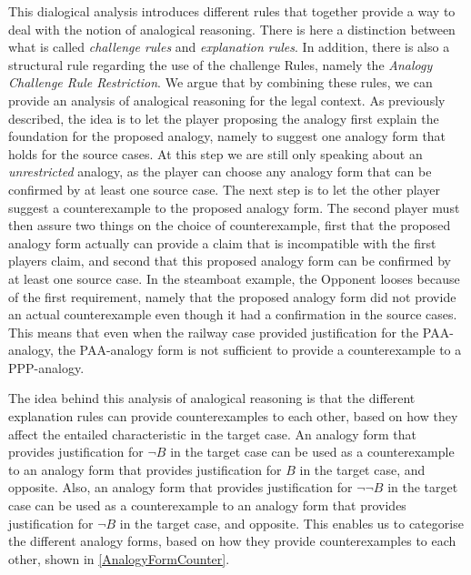				This dialogical analysis introduces different rules that together provide a way to deal with the notion of analogical reasoning. There is here a distinction between what is called \textit{challenge rule\index{rule!challenge}s} and \textit{explanation rules}. In addition, there is also a structural rule regarding the use of the challenge Rule\index{rule!challenge}s, namely the \textit{Analogy Challenge Rule Restriction}. We argue that by combining these rules, we can provide an analysis of analogical reasoning for the legal context. As previously described, the idea is to let the player proposing the analogy first explain the foundation for the proposed analogy, namely to suggest one analogy form that holds for the source cases. At this step we are still only speaking about an \textit{unrestricted} analogy, as the player can choose any analogy form that can be confirmed by at least one source case. The next step is to let the other player suggest a counterexample to the proposed analogy form. The second player must then assure two things on the choice of counterexample, first that the proposed analogy form actually can provide a claim that is incompatible with the first players claim, and second that this proposed analogy form can be confirmed by at least one source case. In the steamboat example, the Opponent looses because of the first requirement, namely that the proposed analogy form did not provide an actual counterexample even though it had a confirmation in the source cases. This means that even when the railway case provided justification for the PAA-analogy, the PAA-analogy form is not sufficient to provide a counterexample to a PPP-analogy. 
				
				The idea behind this analysis of analogical reasoning is that the different explanation rules can provide counterexamples to each other, based on how they affect the entailed characteristic in the target case. An analogy form that provides justification for $\neg B$ in the target case can be used as a counterexample to an analogy form that provides justification for $B$ in the target case, and opposite. Also, an analogy form that provides justification for $\neg \neg B$ in the target case can be used as a counterexample to an analogy form that provides justification for $\neg B$ in the target case, and opposite. This enables us to categorise the different analogy forms, based on how they provide counterexamples to each other, shown in \autoref{AnalogyFormCounter}.
				
